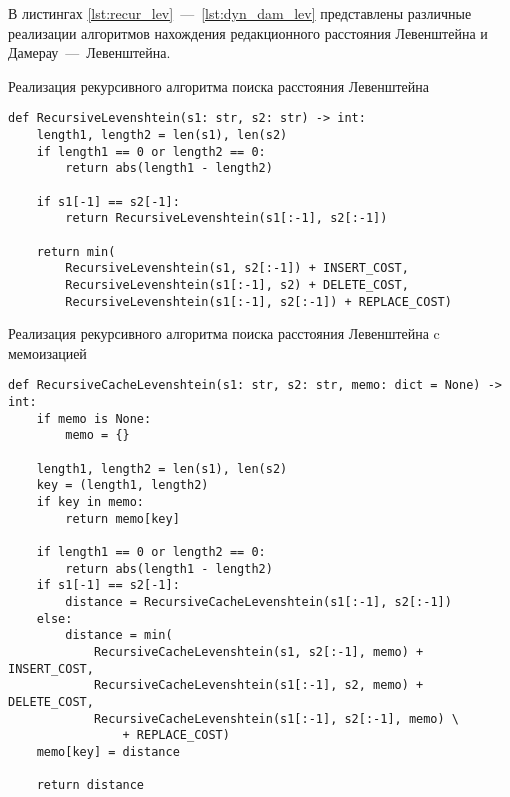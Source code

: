 В листингах \ref{lst:recur_lev}~---~\ref{lst:dyn_dam_lev} представлены различные реализации алгоритмов нахождения редакционного расстояния Левенштейна и Дамерау~---~Левенштейна.

\begin{listing}
\caption{Реализация рекурсивного алгоритма поиска расстояния Левенштейна}
\label{lst:recur_lev}
\begin{verbatim}
def RecursiveLevenshtein(s1: str, s2: str) -> int:
    length1, length2 = len(s1), len(s2)
    if length1 == 0 or length2 == 0:
        return abs(length1 - length2)
   
    if s1[-1] == s2[-1]:
        return RecursiveLevenshtein(s1[:-1], s2[:-1])
    
    return min(
        RecursiveLevenshtein(s1, s2[:-1]) + INSERT_COST,
        RecursiveLevenshtein(s1[:-1], s2) + DELETE_COST,
        RecursiveLevenshtein(s1[:-1], s2[:-1]) + REPLACE_COST)
\end{verbatim}
\end{listing}

\begin{listing}
\caption{Реализация рекурсивного алгоритма поиска расстояния Левенштейна c мемоизацией}
\label{lst:recur_lev_cache}
\begin{verbatim}
def RecursiveCacheLevenshtein(s1: str, s2: str, memo: dict = None) -> int:
    if memo is None:
        memo = {}

    length1, length2 = len(s1), len(s2)
    key = (length1, length2)
    if key in memo:
        return memo[key]

    if length1 == 0 or length2 == 0:
        return abs(length1 - length2)
    if s1[-1] == s2[-1]:
        distance = RecursiveCacheLevenshtein(s1[:-1], s2[:-1])
    else:
        distance = min(
            RecursiveCacheLevenshtein(s1, s2[:-1], memo) + INSERT_COST,
            RecursiveCacheLevenshtein(s1[:-1], s2, memo) + DELETE_COST,
            RecursiveCacheLevenshtein(s1[:-1], s2[:-1], memo) \
                + REPLACE_COST)
    memo[key] = distance

    return distance 
\end{verbatim}
\end{listing}

